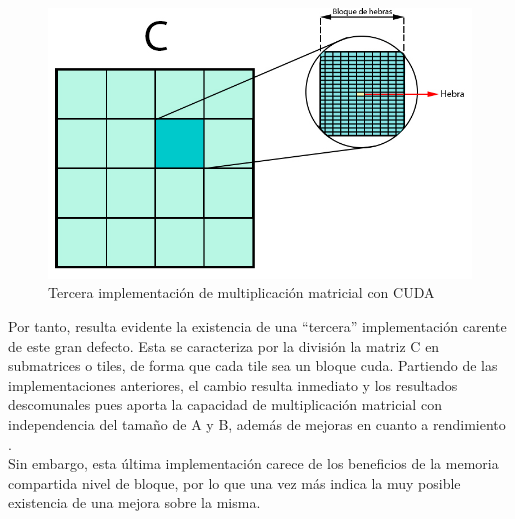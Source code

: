 \begin{figure}[H]
	\centering
	\includegraphics[scale=0.3]{imagenes/gemm_tile_v3.jpg}  
	\caption{Tercera implementación de multiplicación matricial con CUDA}
	\label{fig:mult_matrix_cuda_v3}
\end{figure}

Por tanto, resulta evidente la existencia de una ``tercera'' implementación carente de este gran defecto. Esta se caracteriza por la división la matriz C en submatrices o tiles, de forma que cada tile sea un bloque cuda. Partiendo de las implementaciones anteriores, el cambio resulta inmediato y los resultados descomunales pues aporta la capacidad de multiplicación matricial con independencia del tamaño de A y B, además de mejoras en cuanto a rendimiento \cite{cuda_mult_matrix_v3}. \\
Sin embargo, esta última implementación carece de los beneficios de la memoria compartida nivel de bloque, por lo que una vez más indica la muy posible existencia de una mejora sobre la misma. \\


